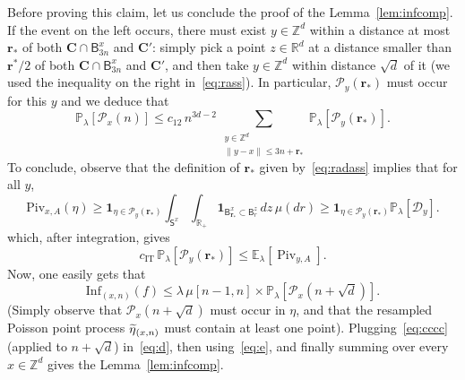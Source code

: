\documentclass[AHL,Unicode,longabstracts]{cedram}
\newcommand{\infl}{\mathrm{Inf}}
\newcommand{\rbf}{\mathbf{r}}
\newcommand{\Cbf}{\mathbf{C}}
\DeclareMathOperator{\IT}{IT}
\DeclareMathOperator{\Piv}{Piv}
\let\oldtilde\tilde
\renewcommand*{\tilde}[1]{\mathchoice{\widetilde{#1}}{\widetilde{#1}}{\oldtilde{#1}}{\oldtilde{#1}}}
\begin{document}
Before proving this claim, let us conclude the proof of the Lemma~\ref{lem:infcomp}. If the event on the left occurs, there must exist $y\in {\mathbb Z}^d$ within a distance at most ${\rbf_*}$ of both ${\Cbf}\cap\mathsf B^x_{3n}$ and ${\Cbf}'$: simply pick a point $z\in{\mathbb R}^d$ at a distance smaller than ${\rbf^*}/2$ of both ${\Cbf}\cap\mathsf B^x_{3n}$ and ${\Cbf'}$, and then take $y\in{\mathbb Z}^d$ within distance $\sqrt d$ of it (we used the inequality on the right in~\eqref{eq:rass}). In particular, ${\mathcal P}_y({\rbf_*})$ must occur for this $y$ and we deduce that
\begin{equation}\label{eq:cccc}
{\mathbb P}_\lambda[{\mathcal P}_x(n)]\le c_{12}\,n^{3d-2}\,\sum_{\substack{y\in{\mathbb Z}^d\\ \|y-x\|\le 3n+\rbf_*}}{\mathbb P}_\lambda[{\mathcal P}_y(\rbf_*)].
\end{equation}
To conclude, observe that the definition of ${\rbf_*}$ given by~\eqref{eq:radass} implies that for all $y$,
\[
\text{Piv}_{x,A} (\eta) \ge \mathbf 1_{\eta \in {\mathcal P}_y({\rbf_*})}\int_{\mathsf S^x} \int_{{\mathbb R}_+} \mathbf 1_{\mathsf B_{\rbf_*}^x\subset \mathsf B_r^z} \,dz \, \mu(d r)\ge \mathbf 1_{\eta \in {\mathcal P}_y({\rbf_*})}{\mathbb P}_\lambda[{\mathcal D}_y].
\]
which, after integration, gives
\begin{equation}\label{eq:e}
{c_{\IT}}\,{\mathbb P}_\lambda[{\mathcal P}_y({\rbf_*})]\le {\mathbb E}_\lambda[{\Piv}_{y,A}].
\end{equation}
Now, one easily gets that
\begin{equation}\label{eq:d}
\infl_{(x,n)}(f) \le \lambda \, \mu[n-1,n]\times {\mathbb P}_\lambda\left[{\mathcal P}_x\left(n+\sqrt d\right)\right].
\end{equation}
(Simply observe that ${\mathcal P}_x(n+\sqrt d)$ must occur in $\eta$, and that the resampled Poisson point process $\tilde\eta_{(x,n)}$ must contain at least one point). Plugging~\eqref{eq:cccc} (applied to $n+\sqrt d$) in~\eqref{eq:d}, then using~\eqref{eq:e}, and finally summing over every $x\in{\mathbb Z}^d$ gives the Lemma~\ref{lem:infcomp}.
\end{document}
